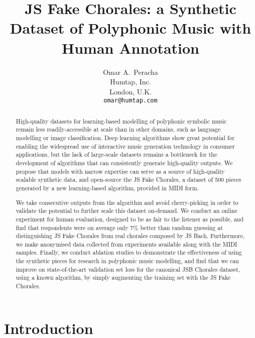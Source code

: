 \documentclass{article}
\title{JS Fake Chorales: a Synthetic Dataset of Polyphonic Music with Human Annotation}
\author{Omar A.~Peracha \\
  Humtap, Inc. \\
  London, U.K. \\
  \texttt{omar@humtap.com} \\
}
\begin{document}
\maketitle

\begin{abstract}
High-quality datasets for learning-based modelling of polyphonic symbolic music remain less readily-accessible at scale than in other domains, such as language modelling or image classification. Deep learning algorithms show great potential for enabling the widespread use of interactive music generation technology in consumer applications, but the lack of large-scale datasets remains a bottleneck for the development of algorithms that can consistently generate high-quality outputs. We propose that models with narrow expertise can serve as a source of high-quality scalable synthetic data, and open-source the JS Fake Chorales, a dataset of 500 pieces generated by a new learning-based algorithm, provided in MIDI form. 

We take consecutive outputs from the algorithm and avoid cherry-picking in order to validate the potential to further scale this dataset on-demand. We conduct an online experiment for human evaluation, designed to be as fair to the listener as possible, and find that respondents were on average only 7\% better than random guessing at distinguishing JS Fake Chorales from real chorales composed by JS Bach. Furthermore, we make anonymised data collected from experiments available along with the MIDI samples. Finally, we conduct ablation studies to demonstrate the effectiveness of using the synthetic pieces for research in polyphonic music modelling, and find that we can improve on state-of-the-art validation set loss for the canonical JSB Chorales dataset, using a known algorithm, by simply augmenting the training set with the JS Fake Chorales.
\end{abstract}
\section{Introduction}\label{sec:introduction}
\end{document}
